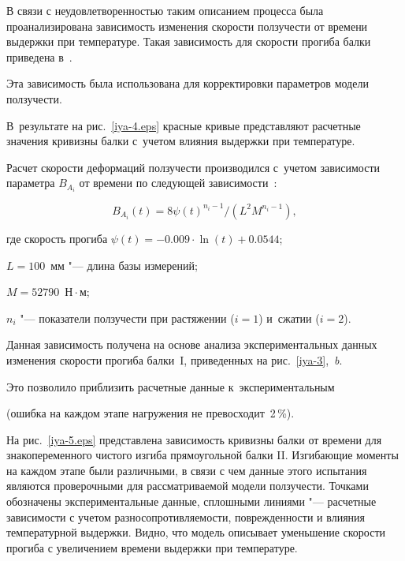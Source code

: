 В связи с неудовлетворенностью таким описанием процесса была проанализирована зависимость изменения скорости ползучести от времени выдержки при температуре. Такая зависимость для скорости прогиба балки приведена в~\cite{iya:Larichkin}. 

Эта зависимость была использована для корректировки параметров модели ползучести. 

В~результате на рис.~\ref{iya-4.eps} красные кривые представляют расчетные значения кривизны балки с~учетом влияния выдержки при температуре. 

Расчет скорости деформаций ползучести производился с~учетом зависимости параметра $B_{A_i}$ от времени по следующей зависимости~\cite{iya:Larichkin}: 

 \begin{equation}

B_{A_i}(t) = 8 \psi(t)^{n_i-1}/(L^{2} M^{n_i-1}),

\end{equation}

где скорость прогиба $\psi(t)=-0.009\cdot \ln(t)+0.0544$; 

$L=100$~мм "--- длина базы измерений; 

$M=52790$~Н${}\cdot{}$м; 

$n_i$ "--- показатели ползучести при растяжении ($i=1$) и~сжатии ($i=2$). 

Данная зависимость получена на основе анализа экспериментальных данных изменения скорости прогиба балки~I, приведенных на рис.~\ref{iya-3},~{\sl b}. 

Это позволило приблизить расчетные данные к~экспериментальным 

(ошибка на каждом этапе нагружения не превосходит~2\,\%).



На рис.~\ref{iya-5.eps} представлена зависимость кривизны балки от времени для знакопеременного чистого изгиба прямоугольной балки II. Изгибающие моменты на каждом этапе были различными, в связи с чем данные этого испытания являются проверочными для рассматриваемой модели ползучести. Точками обозначены экспериментальные данные, сплошными линиями "--- расчетные зависимости с учетом разносопротивляемости, поврежденности и влияния температурной выдержки. Видно, что модель описывает уменьшение скорости прогиба с увеличением времени выдержки при температуре.





